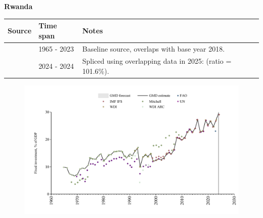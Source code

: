 \documentclass[12pt,a4paper,landscape]{article}
\begin{document}
\begin{adjustbox}{max totalsize={\paperwidth}{\paperheight},center}
\begin{minipage}[t][\textheight][t]{\textwidth}
\vspace*{0.5cm}
{}
\begin{center}
{\Large\bfseries Rwanda}
\end{center}
\vspace{0.5cm}
\begin{table}[H]
\centering
\small
\begin{tabular}{|l|l|l|}
\hline
\textbf{Source} & \textbf{Time span} & \textbf{Notes} \\
\hline
\rowcolor{white}\cite{WDI}& 1965 - 2023 &Baseline source, overlaps with base year 2018.\\
\rowcolor{lightgray}\cite{IMF_IFS}& 2024 - 2024 &Spliced using overlapping data in 2025: (ratio = 101.6\%).\\
\hline
\end{tabular}
\end{table}
\begin{figure}[H]
\centering
\includegraphics[width=\textwidth,height=0.6\textheight,keepaspectratio]{graphs/RWA_finv_GDP.pdf}
\end{figure}
\end{minipage}
\end{adjustbox}
\end{document}
